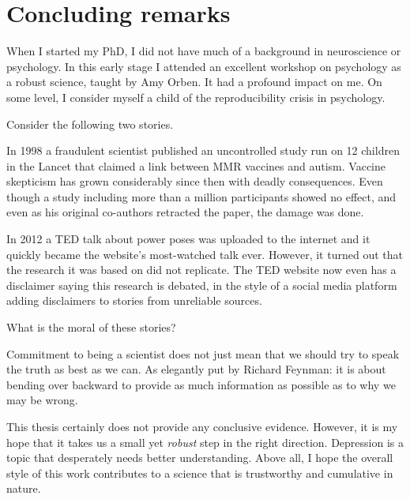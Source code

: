 \clearpage
\section{Concluding remarks}\label{sec:concluding-remarks}

When I started my PhD, I did not have much of a background in neuroscience or psychology.
In this early stage I attended an excellent workshop on psychology as a robust science, taught by Amy Orben.
It had a profound impact on me.
On some level, I consider myself a child of the reproducibility crisis in psychology.

Consider the following two stories.

In 1998 a fraudulent scientist published an uncontrolled study run on 12 children in the Lancet that claimed a link between MMR vaccines and autism.
Vaccine skepticism has grown considerably since then with deadly consequences.
Even though a study including more than a million participants showed no effect, and even as his original co-authors retracted the paper, the damage was done.

In 2012 a TED talk about power poses was uploaded to the internet and it quickly became the website's most-watched talk ever.
However, it turned out that the research it was based on did not replicate.
The TED website now even has a disclaimer saying this research is debated, in the style of a social media platform adding disclaimers to stories from unreliable sources.

What is the moral of these stories?

Commitment to being a scientist does not just mean that we should try to speak the truth as best as we can.
As elegantly put by Richard Feynman: it is about bending over backward to provide as much information as possible as to why we may be wrong.

This thesis certainly does not provide any conclusive evidence.
However, it is my hope that it takes us a small yet \emph{robust} step in the right direction.
Depression is a topic that desperately needs better understanding.
Above all, I hope the overall style of this work contributes to a science that is trustworthy and cumulative in nature.
